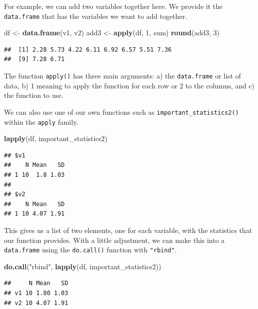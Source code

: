 \documentclass[]{tufte-book}
\newenvironment{Shaded}{}{}
\newcommand{\KeywordTok}[1]{\textcolor[rgb]{0.00,0.44,0.13}{\textbf{#1}}}
\newcommand{\DecValTok}[1]{\textcolor[rgb]{0.25,0.63,0.44}{#1}}
\newcommand{\StringTok}[1]{\textcolor[rgb]{0.25,0.44,0.63}{#1}}
\newcommand{\NormalTok}[1]{#1}
\theoremstyle{definition}
\theoremstyle{definition}
\theoremstyle{remark}
\begin{document}
For example, we can add two variables together here. We provide it the
\texttt{data.frame} that has the variables we want to add together.

\begin{Shaded}
\begin{Highlighting}[]
\NormalTok{df <-}\StringTok{ }\KeywordTok{data.frame}\NormalTok{(v1, v2)}
\NormalTok{add3 <-}\StringTok{ }\KeywordTok{apply}\NormalTok{(df, }\DecValTok{1}\NormalTok{, sum)}
\KeywordTok{round}\NormalTok{(add3, }\DecValTok{3}\NormalTok{)}
\end{Highlighting}
\end{Shaded}

\begin{verbatim}
##  [1] 2.28 5.73 4.22 6.11 6.92 6.57 5.51 7.36
##  [9] 7.28 6.71
\end{verbatim}

The function \texttt{apply()} has three main arguments: a) the
\texttt{data.frame} or list of data, b) 1 meaning to apply the function
for each row or 2 to the columns, and c) the function to use.

We can also use one of our own functions such as
\texttt{important\_statistics2()} within the \texttt{apply} family.

\begin{Shaded}
\begin{Highlighting}[]
\KeywordTok{lapply}\NormalTok{(df, important_statistics2)}
\end{Highlighting}
\end{Shaded}

\begin{verbatim}
## $v1
##    N Mean   SD
## 1 10  1.8 1.03
## 
## $v2
##    N Mean   SD
## 1 10 4.07 1.91
\end{verbatim}

This gives us a list of two elements, one for each variable, with the
statistics that our function provides. With a little adjustment, we can
make this into a \texttt{data.frame} using the \texttt{do.call()}
function with \texttt{"rbind"}.

\begin{Shaded}
\begin{Highlighting}[]
\KeywordTok{do.call}\NormalTok{(}\StringTok{"rbind"}\NormalTok{, }\KeywordTok{lapply}\NormalTok{(df, important_statistics2))}
\end{Highlighting}
\end{Shaded}

\begin{verbatim}
##     N Mean   SD
## v1 10 1.80 1.03
## v2 10 4.07 1.91
\end{verbatim}
\end{document}
